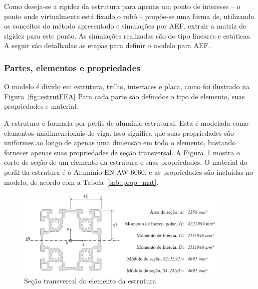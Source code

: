Como deseja-se a rigidez da estrutura para apenas um ponto de interesse -- o
ponto onde virtualmente está fixado o robô -- propõe-se uma forma de, utilizando
os conceitos do método apresentado e simulações por AEF, extrair a matriz de
rigidez para este ponto. As simulações realizadas são do tipo lineares e
estáticas. A seguir são detalhadas as etapas para definir o modelo para AEF.

\subsubsection{Partes, elementos e propriedades}

O modelo é divido em estrutura, trilho, interfaces e placa, como foi ilustrado
na Figura~\ref{fig::estrutFEA} Para cada parte são definidos o tipo de elemento,
suas propriedades e material.

A estrutura é formada por perfis de alumínio estrutural. Esta é modelada como
elementos unidimensionais de viga. Isso significa que suas propriedades são
uniformes ao longo de apenas uma dimensão em todo o elemento, bastando fornecer
apenas suas propriedades de seção transversal. A
Figura~\ref{fig::sectrans_bosch} mostra o corte de seção de um elemento da
estrutura e suas propriedades. O material do perfil da estrutura é o Alumínio
EN-AW-6060. e as propriedades são incluidas no modelo, de acordo com a
Tabela~\ref{tab::prop_mat}.

\begin{figure}[h]
	\centering 
 	\includegraphics[width=0.90\textwidth]{figs/sectrans_bosch}
 	\caption{Seção transversal do elemento da estrutura}
 	\label{fig::sectrans_bosch}
\end{figure}


